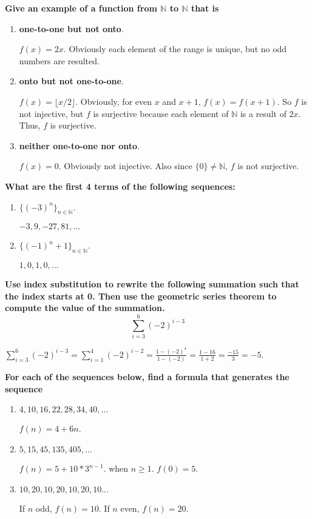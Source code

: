 \documentclass[letterpaper, 12pt]{article}
\begin{document}
\noindent\textbf{Give an example of a function from $\mathbb{N}$ to $\mathbb{N}$ that is}
\begin{enumerate}
    \item \textbf{one-to-one but not onto}.
    
        $f(x) = 2x$. Obviously each element of the range is unique, but no odd numbers are resulted.
    
    \item \textbf{onto but not one-to-one}.
    
        $f(x) = \lfloor x/2 \rfloor$. Obviously, for even $x$ and $x+1$, $f(x) = f(x+1)$. So $f$ is not injective, but $f$ is surjective because each element of $\mathbb{N}$ is a result of $2x$. Thus, $f$ is surjective.
    
    \item \textbf{neither one-to-one nor onto}.
    
        $f(x) = 0$. Obviously not injective. Also since $\{0\} \not= \mathbb{N}$, $f$ is not surjective.
    
\end{enumerate}

\noindent\textbf{What are the first 4 terms of the following sequences:}
\begin{enumerate}
    \item $\{(-3)^n\}_{n\in\mathbb{N}}$.
    
        $-3, 9, -27, 81, ...$
    
    \item $\{(-1)^n + 1\}_{n\in\mathbb{N}}$.
    
        $1, 0, 1, 0, ...$
    
\end{enumerate}

\noindent\textbf{Use index substitution to rewrite the following summation such that the index starts at 0. Then use the geometric series theorem to compute the value of the summation.}
$$\sum_{i = 3}^6(-2)^{i-3}$$

$\sum_{i = 3}^6(-2)^{i-3} = \sum_{i = 1}^4(-2)^{i-2} = \frac{1 - (-2)^4}{1 - (-2)} = \frac{1 - 16}{1 + 2} = \frac{-15}{3} = -5$.

\noindent\textbf{For each of the sequences below, find a formula that generates the sequence}
\begin{enumerate}
    \item $4,10,16,22,28,34,40,...$
    
        $f(n) = 4 + 6n$.
    
    \item $5,15,45,135,405,...$
    
        $f(n) = 5 + 10*3^{n-1}$. when $n\geq 1$. $f(0) = 5$.
    
    \item $10,20,10,20,10,20,10...$
    
        If $n$ odd, $f(n) = 10$. If $n$ even, $f(n) = 20$.
    
\end{enumerate}
\end{document}
